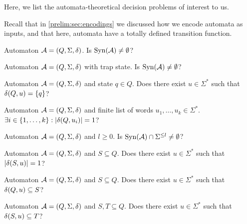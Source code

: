
Here, we list the automata-theoretical decision problems of interest to us.

Recall that in \cref{prelim:sec:encodings} we discussed how we encode automata as inputs,
and that here, automata have a totally defined transition function.

\IN{\DFAS}
{Automaton $\mathcal A = (Q, \Sigma, \delta)$.}
{Is $\operatorname{Syn}(\mathcal A) \ne \emptyset$?}

\IN{\DFAST}
\decisionproblem{\DFAST}
{Automaton $\mathcal A = (Q, \Sigma, \delta)$ with trap state.}
{Is $\operatorname{Syn}(\mathcal A) \ne \emptyset$?}

\IN{\DFASS}
\decisionproblem{\DFASS}
{Automaton $\mathcal A = (Q, \Sigma, \delta)$ and state $q \in Q$.}
{Does there exist $u \in \Sigma^*$ such that $\delta(Q,u) = \{q\}$?}

\IN{\DFASW}
\decisionproblem{\DFASW}
{Automaton $\mathcal A = (Q, \Sigma, \delta)$ and finite list of words $u_1, \ldots, u_k \in \Sigma^*$.}
{$\exists i \in \{1,\ldots, k\} : |\delta(Q,u_i)| = 1$?}

\IN{\DFASWS}
{Automaton $\mathcal A = (Q, \Sigma, \delta)$ and $l \ge 0$.}
{Is $\operatorname{Syn}(\mathcal A) \cap \Sigma^{\le l} \ne \emptyset$?}

\IN{\SFS}
{Automaton $\mathcal A = (Q, \Sigma, \delta)$ and $S \subseteq Q$.}
{Does there exist $u \in \Sigma^*$ such that $|\delta(S,u)| = 1$?}

\IN{\SIS}
{Automaton $\mathcal A = (Q, \Sigma, \delta)$ and $S \subseteq Q$.}
{Does there exist $u \in \Sigma^*$ such that $\delta(Q,u) \subseteq S$?}

\IN{\ST}
{Automaton $\mathcal A = (Q, \Sigma, \delta)$ and $S, T \subseteq Q$.}
{Does there exist $u \in \Sigma^*$ such that $\delta(S,u) \subseteq T$?}

